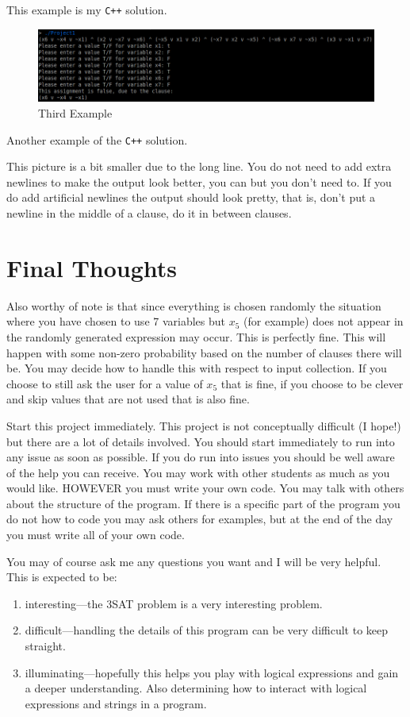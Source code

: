 \documentclass{article}
\begin{document}
This example is my \texttt{C++} solution. 

\begin{figure}[H]
  \centering
  \includegraphics[width=\linewidth]{Ex3}
  \caption{Third Example}
  \label{fig:Ex3}
\end{figure}

Another example of the \texttt{C++} solution.

This picture is a bit smaller due to the long line. You do not need to add extra
newlines to make the output look better, you can but you don't need to. If you
do add artificial newlines the output should look pretty, that is, don't put a
newline in the middle of a clause, do it in between clauses.

\section{Final Thoughts}
Also worthy of note is that since everything is chosen randomly the situation
where you have chosen to use 7 variables but $x_5$ (for example) does not appear
in the randomly generated expression may occur. This is perfectly fine. This
will happen with some non-zero probability based on the number of clauses
there will be. You may decide how to handle this with respect to input
collection. If you choose to still ask the user for a value of $x_5$ that is
fine, if you choose to be clever and skip values that are not used that is also
fine.

Start this project immediately. This project is not conceptually difficult (I
hope!) but there are a lot of details involved. You should start immediately to
run into any issue as soon as possible. If you do run into issues you should be
well aware of the help you can receive. You may work with other students as much
as you would like. HOWEVER you must write your own code. You may talk with
others about the structure of the program. If there is a specific part of the
program you do not how to code you may ask others for examples, but at the end
of the day you must write all of your own code.

You may of course ask me any questions you want and I will be very helpful. This
is expected to be:
\begin{enumerate}
  \item interesting---the 3SAT problem is a very interesting problem.

  \item difficult---handling the details of this program can be very difficult
  to keep straight.

  \item illuminating---hopefully this helps you play with logical expressions
  and gain a deeper understanding. Also determining how to interact with logical
  expressions and strings in a program.
\end{enumerate}
\end{document}
